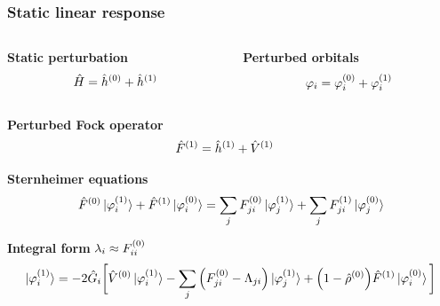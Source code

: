 \begin{frame}
    \frametitle{Static linear response}
    \begin{columns}
    \begin{column}[b]{0.5\linewidth}
    \centering
    \textbf{Static perturbation}
    \begin{equation}
        \nonumber
        \hat{H} = \hat{h}^{(0)} + \hat{h}^{(1)}
    \end{equation}
    \end{column}

    \begin{column}[b]{0.5\linewidth}
    \centering
    \textbf{Perturbed orbitals}
    \begin{equation}
        \nonumber
        \varphi_i = \varphi_i^{(0)} + \varphi_i^{(1)}
    \end{equation}
    \end{column}
    \end{columns}

    \vspace{5mm}

    \centering
    \textbf{Perturbed Fock operator}
    \begin{align}
        \nonumber
        \hat{F}^{(1)} &= \hat{h}^{(1)} + \hat{V}^{(1)}
    \end{align}

    \vspace{5mm}

    \centering
    \textbf{Sternheimer equations}
    \begin{equation}
        \nonumber
        \hat{F}^{(0)}\ket{\varphi_i^{(1)}} +
        \hat{F}^{(1)}\ket{\varphi_i^{(0)}} =
        \sum_j F_{ji}^{(0)}\ket{\varphi_j^{(1)}} + 
        \sum_j F_{ji}^{(1)}\ket{\varphi_j^{(0)}}
    \end{equation}

    \vspace{5mm}

    \centering
    \textbf{Integral form} $\lambda_{i} \approx F^{(0)}_{ii}$
    \begin{equation}
        \nonumber
        \ket{\varphi_i^{(1)}} = -2\hat{G}_i\bigg[
        \hat{V}^{(0)}\ket{\varphi_i^{(1)}} -
        \sum_j \Big(F^{(0)}_{ji} - \Lambda_{ji}\Big)
        \ket{\varphi_j^{(1)}} +
        \Big(1 - \hat{\rho}^{(0)}\Big)
        \hat{F}^{(1)}\ket{\varphi_i^{(0)}}
        \bigg]
    \end{equation}
\end{frame}

